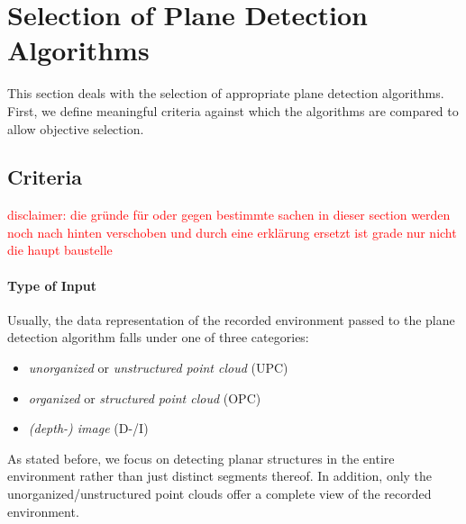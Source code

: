 \documentclass[main.tex]{subfiles}
\begin{document}

\section{Selection of Plane Detection Algorithms}\label{sec:pdaselection}
This section deals with the selection of appropriate plane detection algorithms. 
First, we define meaningful criteria against which the algorithms are compared to allow objective selection.

\subsection{Criteria}
\textcolor{red}{disclaimer: die gründe für oder gegen bestimmte sachen in dieser section werden noch nach hinten verschoben und durch eine erklärung ersetzt ist grade nur nicht die haupt baustelle}
\paragraph{Type of Input}\label{par:input}
Usually, the data representation of the recorded environment passed to the plane detection algorithm falls under one of three categories:
\begin{itemize}
    \item \textit{unorganized} or \textit{unstructured point cloud} (UPC)
    \item \textit{organized} or \textit{structured point cloud} (OPC)
    \item \textit{(depth-) image} (D-/I)
\end{itemize}

As stated before, we focus on detecting planar structures in the entire environment rather than just distinct segments thereof.
In addition, only the unorganized/unstructured point clouds offer a complete view of the recorded environment.
\end{document}
